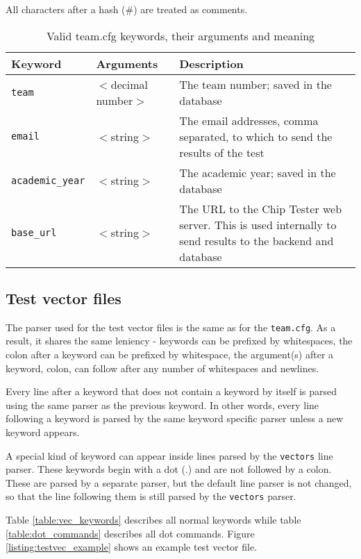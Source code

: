 All characters after a hash (\#) are treated as comments.

\begin{table}[h!]
\centering
\begin{tabular}{ | l | l | p{6cm} | }
 \hline
   Keyword       & Arguments & Description \\
 \hline
   \texttt{team} & $<$decimal number$>$ & The team number; saved in the database \\
 \hline
   \texttt{email} & $<$string$>$ & The email addresses, comma separated, to which to send the results of the test \\
 \hline
   \texttt{academic\_year} & $<$string$>$ & The academic year; saved in the database \\
 \hline
   \texttt{base\_url} & $<$string$>$ & The URL to the Chip Tester web server. This is used internally to send results to the backend and database \\
 \hline
\end{tabular}
\caption{Valid team.cfg keywords, their arguments and meaning}
\label{table:teamcfg_keywords}
\end{table}

\newpage
\subsection{Test vector files}
The parser used for the test vector files is the same as for the \texttt{team.cfg}.
As a result, it shares the same leniency - keywords can be prefixed by whitespaces,
the colon after a keyword can be prefixed by whitespace, the argument(s) after a
keyword, colon, can follow after any number of whitespaces and newlines.

Every line after a keyword that does not contain a keyword by itself is parsed
using the same parser as the previous keyword. In other words, every line following
a keyword is parsed by the same keyword specific parser unless a new keyword appears.

A special kind of keyword can appear inside lines parsed by the \texttt{vectors} line
parser. These keywords begin with a dot (.) and are not followed by a colon. These
are parsed by a separate parser, but the default line parser is not changed, so that
the line following them is still parsed by the \texttt{vectors} parser.

Table \ref{table:vec_keywords} describes all normal keywords while table
\ref{table:dot_commands} describes all dot commands.
Figure \ref{listing:testvec_example} shows an example test vector file.

